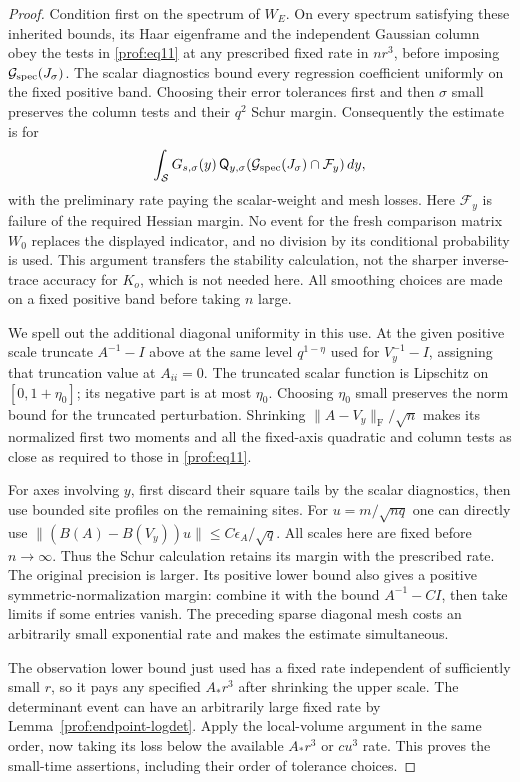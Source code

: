 \begin{proof}
Condition first on the spectrum of \(W_E\). On every spectrum
satisfying these inherited bounds, its Haar eigenframe and the
independent Gaussian column obey the tests in
\eqref{prof:eq11} at any prescribed fixed rate in \(nr^3\),
before imposing \(\mathcal G_{\rm spec}(J_\sigma)\).
The scalar diagnostics bound every regression coefficient uniformly
on the fixed positive band. Choosing their error tolerances first
and then \(\sigma\) small preserves the column tests and their
\(q^2\) Schur margin. Consequently the estimate is for
\[
 \int_{\mathcal S}G_{s,\sigma}(y)\,
   \mathsf Q_{y,\sigma}
      (\mathcal G_{\rm spec}(J_\sigma)\cap\mathcal F_y)\,dy,
\]
with the preliminary rate paying the scalar-weight and mesh losses.
Here \(\mathcal F_y\) is failure of the required Hessian margin.
No event for the fresh comparison matrix \(W_0\) replaces the
displayed indicator, and no division by its conditional probability
is used. This argument transfers the stability calculation, not
the sharper inverse-trace accuracy for \(K_o\), which is not
needed here. All smoothing choices are made on a fixed positive
band before taking \(n\) large.

We spell out the additional diagonal uniformity in this use.
At the given positive scale truncate \(A^{-1}-I\) above at the same level
\(q^{1-\eta}\) used for \(V_y^{-1}-I\), assigning that truncation
value at \(A_{ii}=0\). The truncated scalar function is Lipschitz on $[0,1+\eta_0]$; its
negative part is at most $\eta_0$.  Choosing $\eta_0$ small preserves
the norm bound for the truncated perturbation. Shrinking
$\|A-V_y\|_{\mathrm F}/\sqrt n$ makes its normalized first two
moments and all the fixed-axis quadratic and column tests as close
as required to those in \eqref{prof:eq11}.

For axes involving $y$,
first discard their square tails by the scalar diagnostics, then use
bounded site profiles on the remaining sites.  For $u=m/\sqrt{nq}$
one can directly use
$\|(B(A)-B(V_y))u\|\le C\epsilon_A/\sqrt q$.
All scales here are fixed before $n\to\infty$.  Thus the Schur
calculation retains its margin with the prescribed rate.
The original precision is larger. Its positive lower bound also
gives a positive symmetric-normalization margin: combine it with
the bound $A^{-1}-CI$, then take limits if some entries vanish.
The preceding sparse diagonal mesh costs an arbitrarily small
exponential rate and makes the estimate simultaneous.

The observation lower bound just used has a fixed rate independent
of sufficiently small $r$, so it pays any specified $A_*r^3$ after
shrinking the upper scale.  The determinant event can have an
arbitrarily large fixed rate by Lemma~\ref{prof:endpoint-logdet}.
Apply the local-volume argument in the same order, now taking its
loss below the available $A_*r^3$ or $cu^3$ rate.  This proves the
small-time assertions, including their order of tolerance choices.


\end{proof}
